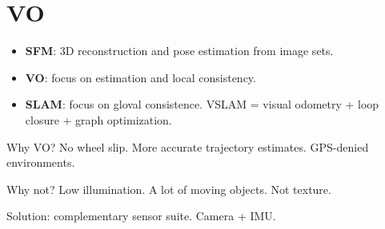 \section{VO}
\begin{itemize}
  \item \textbf{SFM}: 3D reconstruction and pose estimation from image sets.
  \item \textbf{VO}: focus on estimation and local consistency.
  \item \textbf{SLAM}: focus on gloval consistence. VSLAM = visual odometry +
    loop closure + graph optimization.
\end{itemize}

\alert{Why VO?}
No wheel slip.
More accurate trajectory estimates.
GPS-denied environments.

\alert{Why not?}
Low illumination.
A lot of moving objects.
Not texture.

\alert{Solution:} complementary sensor suite. Camera + IMU.
